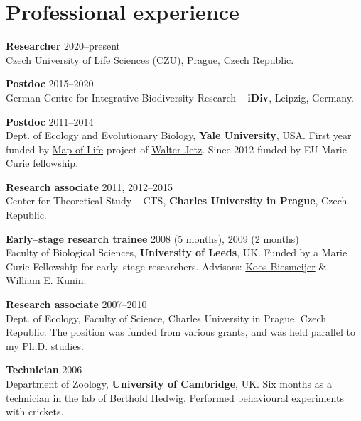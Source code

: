 \HRule

\section{Professional experience}

\begin{innerlist}

\item[]{\bf Researcher} 
\hfill {2020--present} \\
Czech University of Life Sciences (CZU), Prague, Czech Republic.\\

\item[]{\bf Postdoc} 
\hfill {2015--2020} \\
German Centre for Integrative Biodiversity Research -- \textbf{iDiv}, Leipzig, Germany.\\

\item[]{\bf Postdoc} 
\hfill {2011--2014} \\
Dept. of Ecology and Evolutionary Biology, {\bf Yale University}, USA. First year funded by \href{http://www.mappinglife.org/}{Map of Life} project of \href{http://jetzlab.yale.edu/people/walter-jetz}{Walter Jetz}. Since 2012 funded by EU Marie-Curie fellowship.\\

\item[]{\bf Research associate} 
\hfill {2011, 2012--2015} \\ 
Center for Theoretical Study -- CTS, {\bf Charles University in Prague}, Czech Republic. \\

\item[]{\bf Early--stage research trainee} 
\hfill {2008 (5 months), 2009 (2 months)} \\ 
Faculty of Biological Sciences, {\bf University of Leeds}, UK. 
Funded by a Marie Curie Fellowship for early--stage researchers. Advisors: \href{http://www.fbs.leeds.ac.uk/staff/profile.php?tag=Biesmeijer}{Koos Biesmeijer} \& \href{http://www.fbs.leeds.ac.uk/staff/profile.php?tag=Kunin}{William E. Kunin}.\\

\item[]{\bf Research associate} 
\hfill {2007--2010} \\ 
Dept. of Ecology, Faculty of Science, Charles University in Prague, Czech Republic. The position was funded from various grants, and was held parallel to my Ph.D. studies.\\

\item[]{\bf Technician}
\hfill {2006}\\
Department of Zoology, {\bf University of Cambridge}, UK. Six months as a technician in the lab of \href{http://www.zoo.cam.ac.uk/zoostaff/hedwig/index.html}{Berthold Hedwig}. Performed behavioural experiments with crickets.\\\\\\\\

\end{innerlist}


